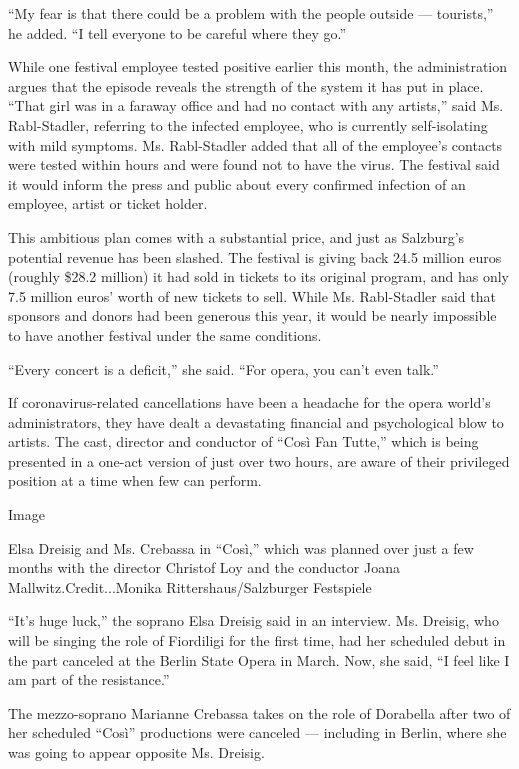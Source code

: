 ``My fear is that there could be a problem with the people outside ---
tourists,'' he added. ``I tell everyone to be careful where they go.''

While one festival employee tested positive earlier this month, the
administration argues that the episode reveals the strength of the
system it has put in place. ``That girl was in a faraway office and had
no contact with any artists,'' said Ms. Rabl-Stadler, referring to the
infected employee, who is currently self-isolating with mild symptoms.
Ms. Rabl-Stadler added that all of the employee's contacts were tested
within hours and were found not to have the virus. The festival said it
would inform the press and public about every confirmed infection of an
employee, artist or ticket holder.

This ambitious plan comes with a substantial price, and just as
Salzburg's potential revenue has been slashed. The festival is giving
back 24.5 million euros (roughly \$28.2 million) it had sold in tickets
to its original program, and has only 7.5 million euros' worth of new
tickets to sell. While Ms. Rabl-Stadler said that sponsors and donors
had been generous this year, it would be nearly impossible to have
another festival under the same conditions.

``Every concert is a deficit,'' she said. ``For opera, you can't even
talk.''

If coronavirus-related cancellations have been a headache for the opera
world's administrators, they have dealt a devastating financial and
psychological blow to artists. The cast, director and conductor of
``Così Fan Tutte,'' which is being presented in a one-act version of
just over two hours, are aware of their privileged position at a time
when few can perform.

Image

Elsa Dreisig and Ms. Crebassa in ``Così,'' which was planned over just a
few months with the director Christof Loy and the conductor Joana
Mallwitz.Credit...Monika Rittershaus/Salzburger Festspiele

``It's huge luck,'' the soprano Elsa Dreisig said in an interview. Ms.
Dreisig, who will be singing the role of Fiordiligi for the first time,
had her scheduled debut in the part canceled at the Berlin State Opera
in March. Now, she said, ``I feel like I am part of the resistance.''

The mezzo-soprano Marianne Crebassa takes on the role of Dorabella after
two of her scheduled ``Così'' productions were canceled --- including in
Berlin, where she was going to appear opposite Ms. Dreisig.

